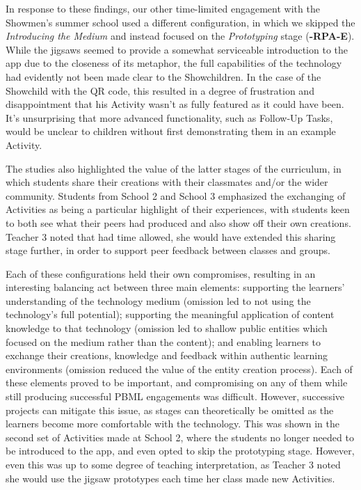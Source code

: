 \documentclass[,hyphens]{sigchi}
\begin{document}
In response to these findings, our other time-limited engagement with the Showmen's summer school used a different configuration, in which we skipped the \textit{Introducing the Medium} and instead focused on the \textit{Prototyping} stage (\textbf{-RPA-E}). While the jigsaws seemed to provide a somewhat serviceable introduction to the app due to the closeness of its metaphor, the full capabilities of the technology had evidently not been made clear to the Showchildren. In the case of the Showchild with the QR code, this resulted in a degree of frustration and disappointment that his Activity wasn't as fully featured as it could have been. It's unsurprising that more advanced functionality, such as Follow-Up Tasks, would be unclear to children without first demonstrating them in an example Activity.

The studies also highlighted the value of the latter stages of the curriculum, in which students share their creations with their classmates and/or the wider community. Students from School 2 and School 3 emphasized the exchanging of Activities as being a particular highlight of their experiences, with students keen to both see what their peers had produced and also show off their own creations. Teacher 3 noted that had time allowed, she would have extended this sharing stage further, in order to support peer feedback between classes and groups.

Each of these configurations held their own compromises, resulting in an interesting balancing act between three main elements: supporting the learners' understanding of the technology medium (omission led to not using the technology's full potential); supporting the meaningful application of content knowledge to that technology (omission led to shallow public entities which focused on the medium rather than the content); and enabling learners to exchange their creations, knowledge and feedback within authentic learning environments (omission reduced the value of the entity creation process). Each of these elements proved to be important, and compromising on any of them while still producing successful PBML engagements was difficult. However, successive projects can mitigate this issue, as stages can theoretically be omitted as the learners become more comfortable with the technology. This was shown in the second set of Activities made at School 2, where the students no longer needed to be introduced to the app, and even opted to skip the prototyping stage. However, even this was up to some degree of teaching interpretation, as Teacher 3 noted she would use the jigsaw prototypes each time her class made new Activities. 
\end{document}
